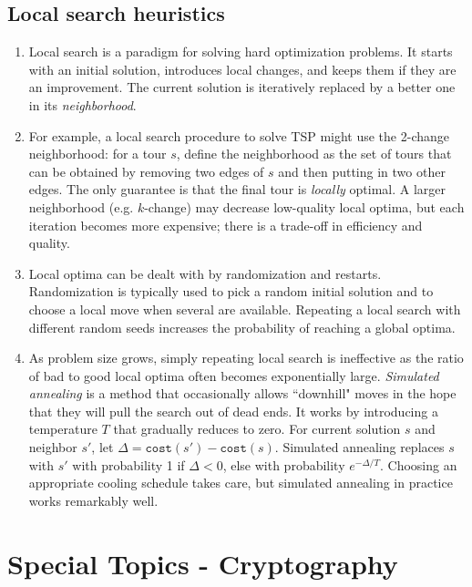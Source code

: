 \documentclass[10pt]{article}
\begin{document}
\begin{multicols}{2}
\begin{addmargin}[0.8em]{0.5em}
    \subsection{Local search heuristics}
    \vspace{-0.2cm}
    \begin{enumerate}[label=(\alph*)]
        \item Local search is a paradigm for solving hard optimization problems. It starts with an initial solution, introduces local changes, and keeps them if they are an improvement. The current solution is iteratively replaced by a better one in its \textit{neighborhood}.
        \item For example, a local search procedure to solve \textsc{TSP} might use the 2-change neighborhood: for a tour $s$, define the neighborhood as the set of tours that can be obtained by removing two edges of $s$ and then putting in two other edges. The only guarantee is that the final tour is \textit{locally} optimal. A larger neighborhood (e.g. $k$-change) may decrease low-quality local optima, but each iteration becomes more expensive; there is a trade-off in efficiency and quality.
        \item Local optima can be dealt with by randomization and restarts. Randomization is typically used to pick a random initial solution and to choose a local move when several are available. Repeating a local search with different random seeds increases the probability of reaching a global optima. 
        \item As problem size grows, simply repeating local search is ineffective as the ratio of bad to good local optima often becomes exponentially large. \textit{Simulated annealing} is a method that occasionally allows ``downhill" moves in the hope that they will pull the search out of dead ends. It works by introducing a temperature $T$ that gradually reduces to zero. For current solution $s$ and neighbor $s'$, let $\Delta = \texttt{cost}(s') - \texttt{cost}(s)$. Simulated annealing replaces $s$ with $s'$ with probability 1 if $\Delta < 0$, else with probability $e^{-\Delta / T}$. Choosing an appropriate cooling schedule takes care, but simulated annealing in practice works remarkably well.
    \end{enumerate}     
\end{addmargin}
\vspace{-0.4cm}
\section{Special Topics - Cryptography}
\begin{addmargin}[0.8em]{0.5em}

\end{addmargin}
\end{multicols}
\end{document}
